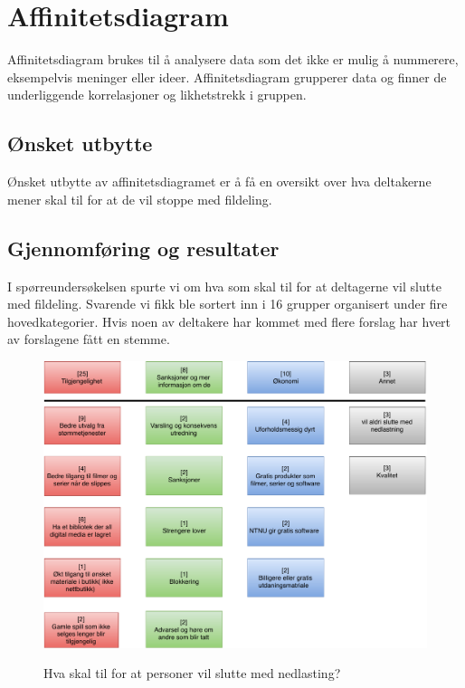 
\section{Affinitetsdiagram}
Affinitetsdiagram brukes til å analysere data som det ikke er mulig å nummerere, eksempelvis meninger eller ideer. Affinitetsdiagram grupperer data og finner de underliggende korrelasjoner og likhetstrekk i gruppen. 

\subsection{Ønsket utbytte}
Ønsket utbytte av affinitetsdiagramet er å få en oversikt over hva deltakerne mener skal til for at de vil stoppe med fildeling.
\subsection{Gjennomføring og resultater}
I spørreundersøkelsen spurte vi om hva som skal til for at deltagerne vil slutte med fildeling. Svarende vi fikk ble sortert inn i 16 grupper organisert under fire hovedkategorier. Hvis noen av deltakere har kommet med flere forslag har hvert av forslagene fått en stemme.  

\begin{figure}[H]
    \centering
    \includegraphics[scale=0.6]{case_1/bilder/stoppe_nedlastning.pdf}
    \label{fig:stoppe_nedlastning}
    \caption{Hva skal til for at personer vil slutte med nedlasting?}
\end{figure}

